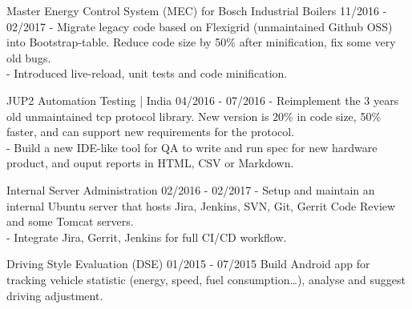 {  \event
  {Master Energy Control System (MEC) for Bosch Industrial Boilers}
  {11/2016 - 02/2017}
  {
     - Migrate legacy code based on Flexigrid (unmaintained Github OSS) into
     Bootstrap-table. Reduce code size by 50\% after minification, fix some
     very old bugs.\\
     - Introduced live-reload, unit tests and code minification.
  }

  \event
  {JUP2 Automation Testing | India}
  {04/2016 - 07/2016}
  {
    - Reimplement the 3 years old unmaintained tcp protocol library. New
    version is 20\% in code size, 50\% faster, and can support new requirements
    for the protocol. \\
    - Build a new IDE-like tool for QA to write and run spec for new hardware
    product, and ouput reports in HTML, CSV or Markdown.
  }

  \event
  {Internal Server Administration}
  {02/2016 - 02/2017}
  {
    - Setup and maintain an internal Ubuntu server that hosts Jira, Jenkins,
      SVN, Git, Gerrit Code Review and some Tomcat servers.\\
    - Integrate Jira, Gerrit, Jenkins for full CI/CD workflow.
  }

  \event
  {Driving Style Evaluation (DSE)}
  {01/2015 - 07/2015}
  {
    Build Android app for tracking vehicle statistic (energy, speed, fuel
    consumption\dots), analyse and suggest driving adjustment.
  }
}

